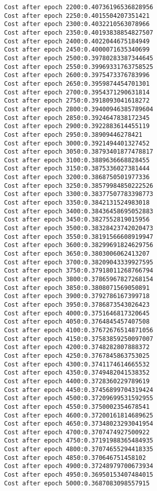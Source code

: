 \documentclass[11pt]{article}
\begin{document}
\begin{Verbatim}[commandchars=\\\{\}]
Cost after epoch 2200:0.40736196536828956
Cost after epoch 2250:0.4015504207351421
Cost after epoch 2300:0.4032210563078966
Cost after epoch 2350:0.40193838854827507
Cost after epoch 2400:0.4022044675184949
Cost after epoch 2450:0.4000071635340699
Cost after epoch 2500:0.39780283387344645
Cost after epoch 2550:0.39969331763758525
Cost after epoch 2600:0.3975473376783996
Cost after epoch 2650:0.3959874454701301
Cost after epoch 2700:0.3954371290631814
Cost after epoch 2750:0.3918093041618272
Cost after epoch 2800:0.39400946385789604
Cost after epoch 2850:0.3924647838172345
Cost after epoch 2900:0.3922883614455119
Cost after epoch 2950:0.38909446278421
Cost after epoch 3000:0.3921494401327452
Cost after epoch 3050:0.38793401877478817
Cost after epoch 3100:0.3889636668828455
Cost after epoch 3150:0.3875336027381444
Cost after epoch 3200:0.3868750501977336
Cost after epoch 3250:0.38579984850222526
Cost after epoch 3300:0.38377507783398773
Cost after epoch 3350:0.3842131524983018
Cost after epoch 3400:0.38436458695052883
Cost after epoch 3450:0.3827552819015956
Cost after epoch 3500:0.38328423742020473
Cost after epoch 3550:0.38191566608919947
Cost after epoch 3600:0.38299691824629756
Cost after epoch 3650:0.3803006062413207
Cost after epoch 3700:0.38209043339927595
Cost after epoch 3750:0.37918011268766794
Cost after epoch 3800:0.37865967827268154
Cost after epoch 3850:0.3808071569050891
Cost after epoch 3900:0.3792786167399718
Cost after epoch 3950:0.3786873543026423
Cost after epoch 4000:0.3751646817320645
Cost after epoch 4050:0.3764845457407508
Cost after epoch 4100:0.37672676514871056
Cost after epoch 4150:0.37583859250097007
Cost after epoch 4200:0.3748282807888372
Cost after epoch 4250:0.3767845863753025
Cost after epoch 4300:0.3741174614665532
Cost after epoch 4350:0.3749482041538352
Cost after epoch 4400:0.3728360229789619
Cost after epoch 4450:0.37456899704319424
Cost after epoch 4500:0.37209699531592955
Cost after epoch 4550:0.3750002354678541
Cost after epoch 4600:0.37200161814689625
Cost after epoch 4650:0.37348023293041954
Cost after epoch 4700:0.3707474927500922
Cost after epoch 4750:0.37191988365484935
Cost after epoch 4800:0.37074655294418335
Cost after epoch 4850:0.370646751458102
Cost after epoch 4900:0.37248979700673934
Cost after epoch 4950:0.36950153407484015
Cost after epoch 5000:0.3687083098557915

    \end{Verbatim}

    \begin{center}
    \end{center}
    { \hspace*{\fill} \\}
    
\end{document}
